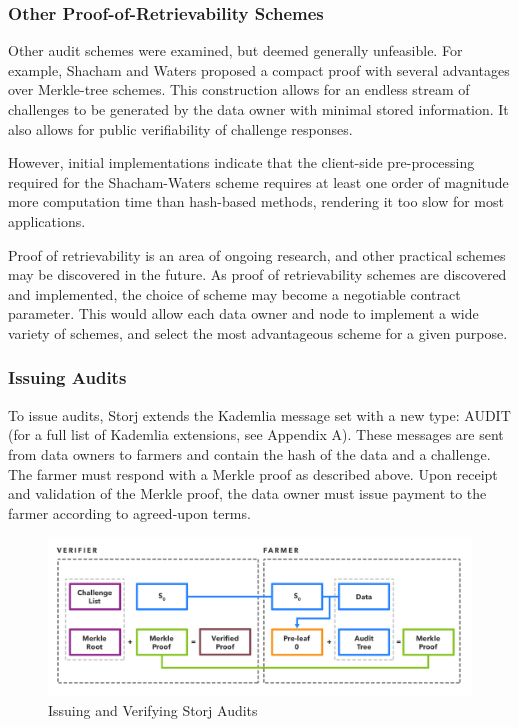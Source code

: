 \documentclass[a4paper,10pt]{article}
\begin{document}
\subsubsection{Other Proof-of-Retrievability Schemes}
Other audit schemes were examined, but deemed generally unfeasible. For example, Shacham and Waters proposed a compact proof \cite{6} with several advantages over Merkle-tree schemes. This construction allows for an endless stream of challenges to be generated by the data owner with minimal stored information. It also allows for public verifiability of challenge responses.

However, initial implementations indicate that the client-side pre-processing required for the Shacham-Waters scheme requires at least one order of magnitude more computation time than hash-based methods, rendering it too slow for most applications.

Proof of retrievability is an area of ongoing research, and other practical schemes may be discovered in the future. As proof of retrievability schemes are discovered and implemented, the choice of scheme may become a negotiable contract parameter. This would allow each data owner and node to implement a wide variety of schemes, and select the most advantageous scheme for a given purpose.

\subsubsection{Issuing Audits}
To issue audits, Storj extends the Kademlia message set with a new type: AUDIT (for a full list of Kademlia extensions, see Appendix A). These messages are sent from data owners to farmers and contain the hash of the data and a challenge. The farmer must respond with a Merkle proof as described above. Upon receipt and validation of the Merkle proof, the data owner must issue payment to the farmer according to agreed-upon terms.

\begin{figure}[hbt]
\centering
\includegraphics[width=\linewidth]{4}
\caption{Issuing and Verifying Storj Audits}
\end{figure}
\end{document}

